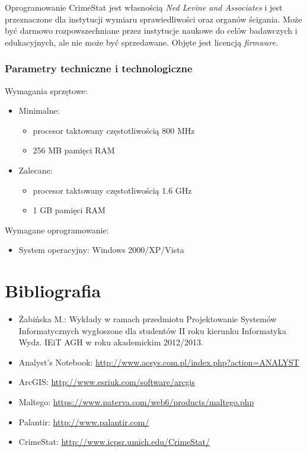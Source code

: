 \documentclass[11pt,a4paper]{article}
\begin{document}
Oprogramowanie CrimeStat jest własnością \emph{Ned Levine and Associates} i jest przeznaczone dla instytucji wymiaru sprawiedliwości oraz organów ścigania. Może być darmowo rozpowszechniane przez instytucje naukowe do celów badawczych i edukacyjnych, ale nie może być sprzedawane. Objęte jest licencją \emph{firmware}.

\subsubsection*{Parametry techniczne i technologiczne}

Wymagania sprzętowe:
\begin{itemize}
	\item Minimalne:
		\begin{itemize}
			\item procesor taktowany częstotliwością 800 MHz
    		\item 256 MB pamięci RAM
		\end{itemize}
	\item Zalecane: 
		\begin{itemize}
			\item procesor taktowany częstotliwością 1.6 GHz
    		\item 1 GB pamięci RAM
		\end{itemize}
\end{itemize}

\raggedright{Wymagane oprogramowanie:}
\begin{itemize}
	\item System operacyjny:  Windows 2000/XP/Vista
\end{itemize}

\newpage
\section{Bibliografia}

\begin{itemize}
	\item Żabińska M.: Wykłady w ramach przedmiotu Projektowanie Systemów Informatycznych wygłoszone dla studentów II roku kierunku Informatyka Wydz. IEiT AGH w roku akademickim 2012/2013.
	\item Analyst’s Notebook: \url{http://www.acsys.com.pl/index.php?action=ANALYST}
	\item ArcGIS: \url{http://www.esriuk.com/software/arcgis}
	\item Maltego: \url{https://www.paterva.com/web6/products/maltego.php}
	\item Palantir: \url{http://www.palantir.com/}
	\item CrimeStat: \url{http://www.icpsr.umich.edu/CrimeStat/}
\end{itemize}
\end{document}
